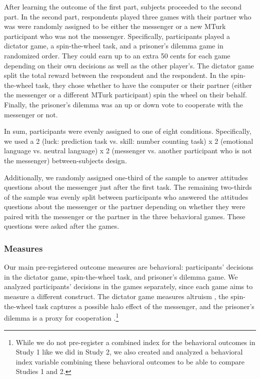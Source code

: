 After learning the outcome of the first part, subjects proceeded to the
second part. In the second part, respondents played three games with their
partner who was were randomly assigned to be either the messenger or a
new MTurk participant who was not the messenger. Specifically,
participants played a dictator game, a spin-the-wheel task, and a
prisoner's dilemma game in randomized order. They could earn
up to an extra 50 cents for each game depending on their own decisions
as well as the other player's. The dictator game split the total reward
between the respondent and the respondent. In the spin-the-wheel task,
they chose whether to have the computer or their partner (either the
messenger or a different MTurk participant) spin the wheel on their
behalf. Finally, the prisoner's dilemma was an up or down vote to
cooperate with the messenger or not.

In sum, participants were evenly assigned to one of eight conditions.
Specifically, we used a 2 (luck: prediction task vs. skill: number
counting task) x 2 (emotional language vs. neutral language) x 2
(messenger vs. another participant who is not the messenger)
between-subjects design.

Additionally, we randomly assigned one-third of the sample to answer
attitudes questions about the messenger just after the first task. The
remaining two-thirds of the sample was evenly split between participants
who answered the attitudes questions about the messenger or the partner
depending on whether they were paired with the messenger or the partner
in the three behavioral games. These questions were asked after the
games.

\subsubsection{Measures}

Our main pre-registered outcome measures are behavioral: participants'
decisions in the dictator game, spin-the-wheel task, and prisoner's
dilemma game. We analyzed participants' decisions in the games
separately, since each game aims to measure a different construct. The
dictator game measures altruism \citep{bekkers2007measuring, benenson2007children,johannesson2000non}, 
the spin-the-wheel task captures a
possible halo effect of the messenger, and the prisoner's dilemma is a
proxy for cooperation \citep{bendor1991doubt, rapoport1965prisoner}.\footnote{While 
we do not pre-register a combined index for the
  behavioral outcomes in Study 1 like we did in Study 2, we
  also created and analyzed a behavioral index variable combining these
  behavioral outcomes to be able to compare Studies 1 and 2.}

